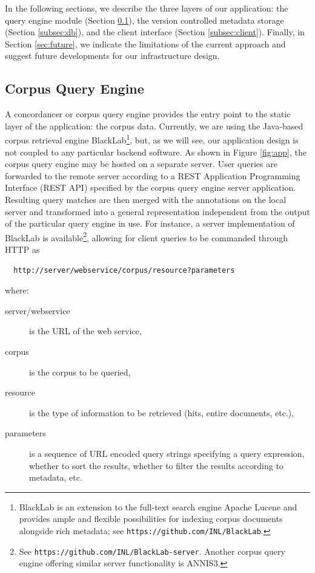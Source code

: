 \documentclass{sig-alternate}
\begin{document}
In the following sections, we describe the three layers of our application: the query engine module
(Section \ref{subsec:conc}), the version controlled metadata storage (Section \ref{subsec:db}),
and the client interface (Section \ref{subsec:client}). Finally, in Section \ref{sec:future},
we indicate the limitations of the current approach and suggest future developments for our
infrastructure design.

\subsection{Corpus Query Engine}\label{subsec:conc}
A concordancer or corpus query engine provides the entry point to the static layer of the
application: the corpus data. Currently, we are using the Java-based corpus retrieval engine
BlackLab\footnote{
  BlackLab is an extension to the full-text search engine Apache Lucene and provides ample and
  flexible possibilities for indexing corpus documents alongside rich metadata; see
  \texttt{https://github.com/INL/BlackLab}.
}, but, as we will see, our application design is not coupled to any particular backend software.
As shown in Figure \ref{fig:app}, the corpus query engine may be hosted on a separate server.
User queries are forwarded to the remote server according to a REST Application Programming
Interface (REST API) specified by the corpus query engine server application. Resulting query
matches are then merged with the annotations on the local server and transformed into a general
representation independent from the output of the particular query engine in use.
For instance, a server implementation of BlackLab is available\footnote{
  See \texttt{https://github.com/INL/BlackLab-server}. Another corpus query engine offering similar
  server functionality is ANNIS3.
}, allowing for client queries to be commanded through HTTP as
\begin{verbatim}
  http://server/webservice/corpus/resource?parameters
\end{verbatim}
where:

\begin{description}
\item [server/webservice] is the URL of the web service,
\item [corpus] is the corpus to be queried,
\item [resource] is the type of information to be retrieved (hits, entire documents, etc.),
\item [parameters] is a sequence of URL encoded query strings specifying a query expression,
  whether to sort the results, whether to filter the results according to metadata, etc.
\end{description}
\end{document}
